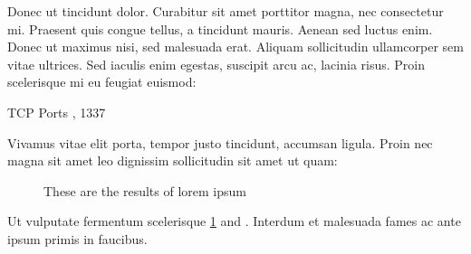 \clearpage

Donec ut tincidunt dolor. Curabitur sit amet porttitor magna, nec consectetur mi. Praesent quis
congue tellus, a tincidunt mauris. Aenean sed luctus enim. Donec ut maximus nisi, sed malesuada
erat. Aliquam sollicitudin ullamcorper sem vitae ultrices. Sed iaculis enim egestas, suscipit arcu
ac, lacinia risus. Proin scelerisque mi eu feugiat euismod:

\begin{schema}{TCP}
    Ports
    , 1337
\end{schema}

Vivamus vitae elit porta, tempor justo tincidunt, accumsan ligula. Proin nec magna sit amet leo
dignissim sollicitudin sit amet ut quam:

\begin{figure}[h]
    \begin{center}
        \caption{These are the results of lorem ipsum}
        \label{fig:scanResults}
    \end{center}
\end{figure}

Ut vulputate fermentum scelerisque \ref{fig:scanResults} and \pageref{fig:scanResults}. Interdum et
malesuada fames ac ante ipsum primis in faucibus.
